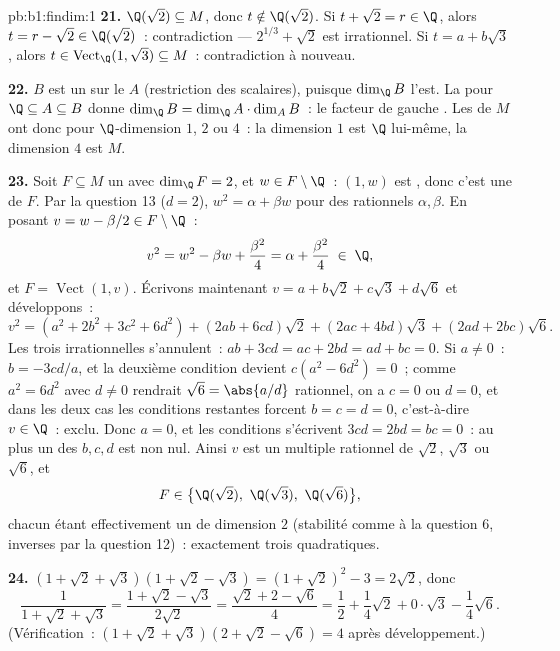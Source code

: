 \begin{solution}{pb:b1:findim:1}
\textbf{21.} $\Q(\sqrt2) \subseteq M$, donc $t \notin \Q(\sqrt2)$.
Si $t + \sqrt2 = r \in \Q$, alors $t = r - \sqrt2 \in \Q(\sqrt2)$~:
contradiction --- $2^{1/3} + \sqrt2$ est irrationnel. Si $t = a +
b\sqrt3$, alors $t \in \operatorname{Vect}_\Q(1, \sqrt3) \subseteq
M$~: contradiction à nouveau.

\textbf{22.} $B$ est un  sur le  $A$
(restriction des scalaires),  puisque $\dim_\Q B$
l'est. La  pour $\Q \subseteq A \subseteq B$ donne
$\dim_\Q B = \dim_\Q A \cdot \dim_A B$~: le facteur de gauche .
Les  de $M$ ont donc pour $\Q$-dimension $1$, $2$ ou $4$~:
la dimension $1$ est $\Q$ lui-même, la dimension $4$ est $M$.

\textbf{23.} Soit $F \subseteq M$ un  avec $\dim_\Q F =
2$, et $w \in F \setminus \Q$~: $(1, w)$ est , donc c'est une
 de $F$. Par la question 13 ($d = 2$), $w^2 = \alpha + \beta w$
pour des rationnels $\alpha, \beta$. En posant $v = w - \beta/2 \in F
\setminus \Q$~:
\[
v^2 = w^2 - \beta w + \frac{\beta^2}4 = \alpha + \frac{\beta^2}4
\;\in\; \Q,
\]
et $F = \operatorname{Vect}(1, v)$. Écrivons maintenant $v = a +
b\sqrt2 + c\sqrt3 + d\sqrt6$ et développons~:
\[
v^2 = (a^2 + 2b^2 + 3c^2 + 6d^2)
+ (2ab + 6cd)\sqrt2 + (2ac + 4bd)\sqrt3 + (2ad + 2bc)\sqrt6 .
\]
Les trois  irrationnelles s'annulent~: $ab + 3cd = ac + 2bd
= ad + bc = 0$. Si $a \neq 0$~: $b = -3cd/a$, et la deuxième
condition devient $c(a^2 - 6d^2) = 0$~; comme $a^2 = 6d^2$ avec $d
\neq 0$ rendrait $\sqrt6 = \abs{a/d}$ rationnel, on a $c = 0$ ou
$d = 0$, et dans les deux cas les conditions restantes forcent $b =
c = d = 0$, c'est-à-dire $v \in \Q$~: exclu. Donc $a = 0$, et les
conditions s'écrivent $3cd = 2bd = bc = 0$~: au plus un des $b, c, d$
est non nul. Ainsi $v$ est un multiple rationnel de $\sqrt2$, $\sqrt3$
ou $\sqrt6$, et
\[
F \in \bigl\{\Q(\sqrt2),\ \Q(\sqrt3),\ \Q(\sqrt6)\bigr\} ,
\]
chacun étant effectivement un  de dimension $2$ (stabilité
comme à la question 6, inverses par la question 12)~: exactement trois
 quadratiques.

\textbf{24.} $(1 + \sqrt2 + \sqrt3)(1 + \sqrt2 - \sqrt3) = (1 +
\sqrt2)^2 - 3 = 2\sqrt2$, donc
\[
\frac1{1 + \sqrt2 + \sqrt3}
= \frac{1 + \sqrt2 - \sqrt3}{2\sqrt2}
= \frac{\sqrt2 + 2 - \sqrt6}{4}
= \frac12 + \frac14\sqrt2 + 0\cdot\sqrt3 - \frac14\sqrt6 .
\]
(Vérification~: $(1 + \sqrt2 + \sqrt3)(2 + \sqrt2 - \sqrt6) = 4$ après
développement.)


\end{solution}

